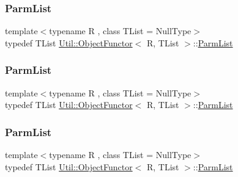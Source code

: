 \mbox{\label{classUtil_1_1ObjectFunctor_ae0ad0a2f4b9f3a67014d4fc237df3c99}} 
\subsubsection{\texorpdfstring{ParmList}{ParmList}\hspace{0.1cm}{\footnotesize\ttfamily [1/3]}}
{\footnotesize\ttfamily template$<$typename R , class T\+List  = Null\+Type$>$ \\
typedef T\+List \mbox{\hyperlink{classUtil_1_1ObjectFunctor}{Util\+::\+Object\+Functor}}$<$ R, T\+List $>$\+::\mbox{\hyperlink{classUtil_1_1ObjectFunctor_ae0ad0a2f4b9f3a67014d4fc237df3c99}{Parm\+List}}}

\mbox{\label{classUtil_1_1ObjectFunctor_ae0ad0a2f4b9f3a67014d4fc237df3c99}} 
\subsubsection{\texorpdfstring{ParmList}{ParmList}\hspace{0.1cm}{\footnotesize\ttfamily [2/3]}}
{\footnotesize\ttfamily template$<$typename R , class T\+List  = Null\+Type$>$ \\
typedef T\+List \mbox{\hyperlink{classUtil_1_1ObjectFunctor}{Util\+::\+Object\+Functor}}$<$ R, T\+List $>$\+::\mbox{\hyperlink{classUtil_1_1ObjectFunctor_ae0ad0a2f4b9f3a67014d4fc237df3c99}{Parm\+List}}}

\mbox{\label{classUtil_1_1ObjectFunctor_ae0ad0a2f4b9f3a67014d4fc237df3c99}} 
\subsubsection{\texorpdfstring{ParmList}{ParmList}\hspace{0.1cm}{\footnotesize\ttfamily [3/3]}}
{\footnotesize\ttfamily template$<$typename R , class T\+List  = Null\+Type$>$ \\
typedef T\+List \mbox{\hyperlink{classUtil_1_1ObjectFunctor}{Util\+::\+Object\+Functor}}$<$ R, T\+List $>$\+::\mbox{\hyperlink{classUtil_1_1ObjectFunctor_ae0ad0a2f4b9f3a67014d4fc237df3c99}{Parm\+List}}}

